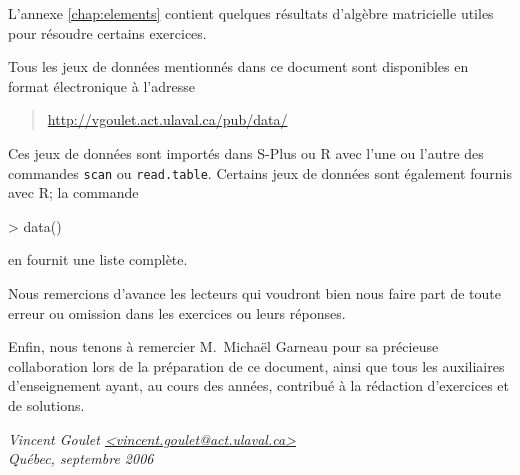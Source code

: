 L'annexe \ref{chap:elements} contient quelques résultats d'algèbre
matricielle utiles pour résoudre certains exercices.

Tous les jeux de données mentionnés dans ce document sont disponibles
en format électronique à l'adresse
\begin{quote}
  \url{http://vgoulet.act.ulaval.ca/pub/data/}
\end{quote}
Ces jeux de données sont importés dans S-Plus ou \textsf{R} avec l'une
ou l'autre des commandes \texttt{scan} ou
\texttt{read.table}. Certains jeux de données sont également fournis
avec \textsf{R}; la commande
\begin{Sinput}
> data()
\end{Sinput}
en fournit une liste complète.

Nous remercions d'avance les lecteurs qui voudront bien nous faire
part de toute erreur ou omission dans les exercices ou leurs réponses.

Enfin, nous tenons à remercier M.~Michaël Garneau pour sa précieuse
collaboration lors de la préparation de ce document, ainsi que tous
les auxiliaires d'enseignement ayant, au cours des années, contribué à
la rédaction d'exercices et de solutions.

\begin{flushright}
  \itshape
  Vincent Goulet \url{<vincent.goulet@act.ulaval.ca>} \\
  Québec, septembre 2006
\end{flushright}

